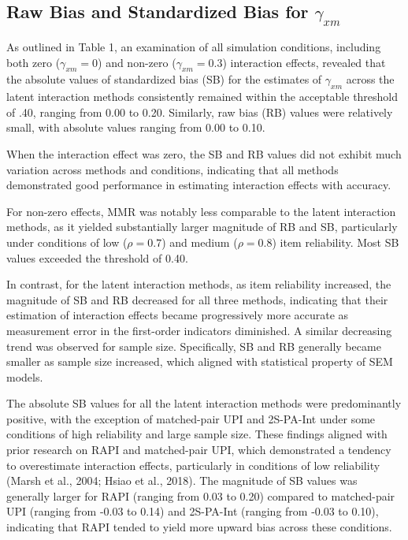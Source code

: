 \documentclass[
  man,mask]{apa6}
\begin{document}
\subsection{\texorpdfstring{Raw Bias and Standardized Bias for \(\gamma_{xm}\)}{Raw Bias and Standardized Bias for \textbackslash gamma\_\{xm\}}}\label{raw-bias-and-standardized-bias-for-gamma_xm}

As outlined in Table 1, an examination of all simulation conditions, including both zero (\(\gamma_{xm} = 0\)) and non-zero (\(\gamma_{xm} = 0.3\)) interaction effects, revealed that the absolute values of standardized bias (SB) for the estimates of \(\gamma_{xm}\) across the latent interaction methods consistently remained within the acceptable threshold of .40, ranging from 0.00 to 0.20. Similarly, raw bias (RB) values were relatively small, with absolute values ranging from 0.00 to 0.10.

When the interaction effect was zero, the SB and RB values did not exhibit much variation across methods and conditions, indicating that all methods demonstrated good performance in estimating interaction effects with accuracy.

For non-zero effects, MMR was notably less comparable to the latent interaction methods, as it yielded substantially larger magnitude of RB and SB, particularly under conditions of low (\(\rho = 0.7\)) and medium (\(\rho = 0.8\)) item reliability. Most SB values exceeded the threshold of 0.40.

In contrast, for the latent interaction methods, as item reliability increased, the magnitude of SB and RB decreased for all three methods, indicating that their estimation of interaction effects became progressively more accurate as measurement error in the first-order indicators diminished. A similar decreasing trend was observed for sample size. Specifically, SB and RB generally became smaller as sample size increased, which aligned with statistical property of SEM models.

The absolute SB values for all the latent interaction methods were predominantly positive, with the exception of matched-pair UPI and 2S-PA-Int under some conditions of high reliability and large sample size. These findings aligned with prior research on RAPI and matched-pair UPI, which demonstrated a tendency to overestimate interaction effects, particularly in conditions of low reliability (Marsh et al., 2004; Hsiao et al., 2018). The magnitude of SB values was generally larger for RAPI (ranging from 0.03 to 0.20) compared to matched-pair UPI (ranging from -0.03 to 0.14) and 2S-PA-Int (ranging from -0.03 to 0.10), indicating that RAPI tended to yield more upward bias across these conditions.
\end{document}

